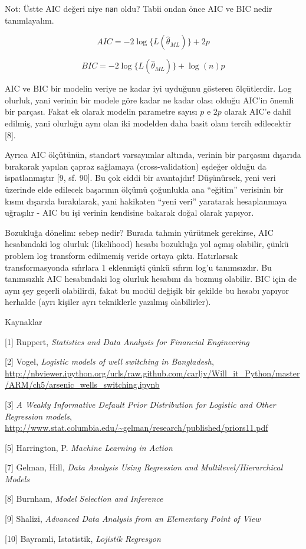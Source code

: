 \documentclass[12pt,fleqn]{article}\usepackage{../../common}
\begin{document}
Not: Üstte AIC değeri niye \verb!nan! oldu? Tabii ondan önce AIC ve BIC
nedir tanımlayalım. 

$$ AIC = -2\log \{ L(\hat{\theta}_{ML}) \} + 2p $$

$$ BIC = -2\log \{ L(\hat{\theta}_{ML}) \} + \log(n)p $$

AIC ve BIC bir modelin veriye ne kadar iyi uyduğunu gösteren ölçütlerdir. Log
olurluk, yani verinin bir modele göre kadar ne kadar olası olduğu AIC'in önemli
bir parçası. Fakat ek olarak modelin parametre sayısı $p$ e $2p$ olarak AIC'e
dahil edilmiş, yani olurluğu aynı olan iki modelden daha basit olanı tercih
edilecektir [8].

Ayrıca AIC ölçütünün, standart varsayımlar altında, verinin bir parçasını
dışarıda bırakarak yapılan çapraz sağlamaya (cross-validation) eşdeğer olduğu da
ispatlanmıştır [9, sf. 90]. Bu çok ciddi bir avantajdır!  Düşünürsek, yeni veri
üzerinde elde edilecek başarının ölçümü çoğunlukla ana ``eğitim'' verisinin bir
kısmı dışarıda bırakılarak, yani hakikaten ``yeni veri'' yaratarak hesaplanmaya
uğraşılır - AIC bu işi verinin kendisine bakarak doğal olarak yapıyor.

Bozukluğa dönelim: sebep nedir? Burada tahmin yürütmek gerekirse, AIC
hesabındaki log olurluk (likelihood) hesabı bozukluğa yol açmış olabilir, çünkü
problem log transform edilmemiş veride ortaya çıktı. Hatırlarsak
transformasyonda sıfırlara 1 eklenmişti çünkü sıfırın log'u tanımsızdır. Bu
tanımsızlık AIC hesabındaki log olurluk hesabını da bozmuş olabilir. BIC için de
aynı şey geçerli olabilirdi, fakat bu modül değişik bir şekilde bu hesabı
yapıyor herhalde (ayrı kişiler ayrı tekniklerle yazılmış olabilirler).

Kaynaklar

[1] Ruppert, {\em Statistics and Data Analysis for Financial Engineering}

[2] Vogel, {\em Logistic models of well switching in Bangladesh}, 
    \url{http://nbviewer.ipython.org/urls/raw.github.com/carljv/Will_it_Python/master/ARM/ch5/arsenic_wells_switching.ipynb}

[3] {\em A Weakly Informative Default Prior Distribution for Logistic and Other Regression models}, 
    \url{http://www.stat.columbia.edu/~gelman/research/published/priors11.pdf}

[5] Harrington, P. {\em Machine Learning in Action}

[7] Gelman, Hill, {\em Data Analysis Using Regression and Multilevel/Hierarchical Models}

[8] Burnham, {\em Model Selection and Inference}

[9] Shalizi, {\em Advanced Data Analysis from an Elementary Point of View}

[10] Bayramli, Istatistik, {\em Lojistik Regresyon}
\end{document}
